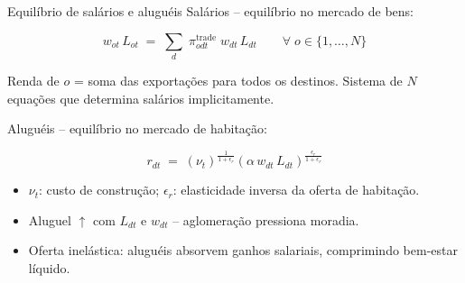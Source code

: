 \begin{frame}{Equilíbrio de salários e aluguéis}
    Salários -- equilíbrio no mercado de bens:

    \begin{equation}\label{eq:wages}
        w_{ot}\,L_{ot} \;=\; \sum_{d}\;\pi_{odt}^{\text{trade}}\;w_{dt}\,L_{dt}
        \qquad \forall\; o \in \{1,\ldots,N\}
    \end{equation}

    \small Renda de $o$ = soma das exportações para todos os destinos. Sistema de $N$ equações que determina salários implicitamente.

    \vspace{0.2cm}

    Aluguéis -- equilíbrio no mercado de habitação:

    \begin{equation}\label{eq:rent}
        r_{dt} \;=\; (\nu_t)^{\frac{1}{1+\epsilon_r}} \left(\alpha\, w_{dt}\,L_{dt}\right)^{\!\frac{\epsilon_r}{1+\epsilon_r}}
    \end{equation}

    \small
    \begin{itemize}
        \item $\nu_t$: custo de construção; $\epsilon_r$: elasticidade inversa da oferta de habitação.
        \item Aluguel $\uparrow$ com $L_{dt}$ e $w_{dt}$ -- aglomeração pressiona moradia.
        \item Oferta inelástica: aluguéis absorvem ganhos salariais, comprimindo bem-estar líquido.
    \end{itemize}
\end{frame}

